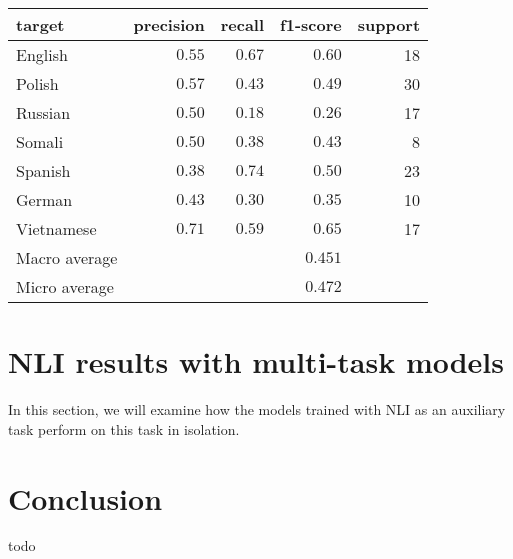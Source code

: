 \begin{table}
  \centering
  \begin{tabular}{lrrrr}
    \toprule
    target   & precision &  recall & f1-score & support \\
    \midrule
    English    &   $0.55$  &   $0.67$   &  $0.60$  &     18 \\
    Polish     &   $0.57$  &   $0.43$   &  $0.49$  &     30 \\
    Russian    &   $0.50$  &   $0.18$   &  $0.26$  &     17 \\
    Somali     &   $0.50$  &   $0.38$   &  $0.43$  &      8 \\
    Spanish    &   $0.38$  &   $0.74$   &  $0.50$  &     23 \\
    German     &   $0.43$  &   $0.30$   &  $0.35$  &     10 \\
    Vietnamese &   $0.71$  &   $0.59$   &  $0.65$  &     17 \\
    \midrule
    Macro average &     &      &           $0.451$ & \\
    Micro average &     &      &           $0.472$ & \\
    \bottomrule
  \end{tabular}
\end{table}

\section{NLI results with multi-task models}

In this section, we will examine how the models trained with \ac{NLI} as
an auxiliary task perform on this task in isolation.





\section{Conclusion}

todo
